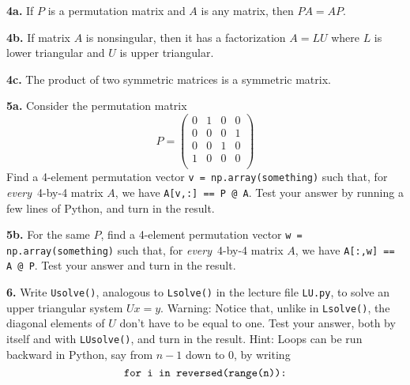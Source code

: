 \documentclass[11pt]{article}
\begin{document}
\par\medskip
{\bf 4a.}
If $P$ is a permutation matrix and $A$ is any matrix, then $PA=AP$.

\par\medskip
{\bf 4b.}
If matrix $A$ is nonsingular, then it has a factorization $A=LU$
where $L$ is lower triangular and $U$ is upper triangular.

\par\medskip
{\bf 4c.}
The product of two symmetric matrices is a symmetric matrix.

\newpage
\par\bigskip
{\bf 5a.} Consider the permutation matrix 
$$P =
   \left(
   \begin{array}{cccc}
    0 & 1 & 0 & 0 \\ 	
    0 & 0 & 0 & 1 \\ 	
    0 & 0 & 1 & 0 \\ 	
    1 & 0 & 0 & 0 \\ 	
   \end{array} \right)
$$
Find a 4-element permutation vector {\tt v = np.array(something)}
such that, for {\em every}\, 4-by-4 matrix $A$, 
we have {\tt A[v,:] == P @ A}.
Test your answer by running a few lines of Python, 
and turn in the result.

\par\medskip
{\bf 5b.} For the same $P$, 
find a 4-element permutation vector {\tt w = np.array(something)}
such that, for {\em every}\, 4-by-4 matrix $A$, 
we have {\tt A[:,w] == A @ P}. 
Test your answer and turn in the result.

\par\bigskip
{\bf 6.}
Write {\tt Usolve()}, analogous to {\tt Lsolve()} in 
the lecture file {\tt LU.py},
to solve an upper triangular system $Ux=y$. 
Warning: Notice that, unlike in {\tt Lsolve()}, 
the diagonal elements of $U$ don't have to be equal to one.
Test your answer, both by itself and with {\tt LUsolve()},
and turn in the result.
Hint: Loops can be run backward in Python, 
say from $n-1$ down to $0$, by writing
$$\mbox{\tt for i in reversed(range(n)):}$$
\end{document}
